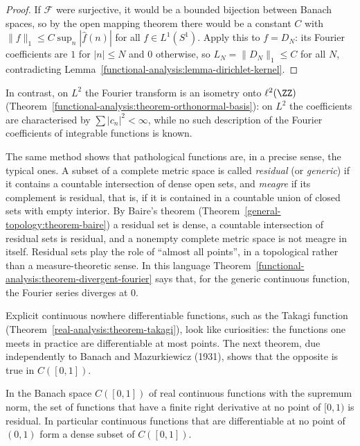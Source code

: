 \begin{proof}
If $\mathcal{F}$ were surjective, it would be a bounded bijection between Banach spaces, so by the open mapping theorem there would be a constant $C$ with $\|f\|_1 \leq C\sup_n|\hat f(n)|$ for all
$f \in L^1(S^1)$. Apply this to $f = D_N$: its Fourier coefficients are $1$ for $|n| \leq N$ and $0$ otherwise, so $L_N = \|D_N\|_1 \leq C$ for all $N$, contradicting
Lemma~\ref{functional-analysis:lemma-dirichlet-kernel}.
\end{proof}

In contrast, on $L^2$ the Fourier transform is an isometry onto $\ell^2(\ZZ)$ (Theorem~\ref{functional-analysis:theorem-orthonormal-basis}): on $L^2$ the coefficients are characterised by
$\sum|c_n|^2 < \infty$, while no such description of the Fourier coefficients of integrable functions is known.

The same method shows that pathological functions are, in a precise sense, the typical ones. A subset of a complete metric space is called \emph{residual} (or \emph{generic}) if it contains a
countable intersection of dense open sets, and \emph{meagre} if its complement is residual, that is, if it is contained in a countable union of closed sets with empty interior. By Baire's theorem
(Theorem~\ref{general-topology:theorem-baire}) a residual set is dense, a countable intersection of residual sets is residual, and a nonempty complete metric space is not meagre in itself. Residual sets
play the role of ``almost all points'', in a topological rather than a measure-theoretic sense. In this language Theorem~\ref{functional-analysis:theorem-divergent-fourier} says that, for the generic
continuous function, the Fourier series diverges at $0$.

Explicit continuous nowhere differentiable functions, such as the Takagi function (Theorem~\ref{real-analysis:theorem-takagi}), look like curiosities: the functions one meets in practice are differentiable at most
points. The next theorem, due independently to Banach and Mazurkiewicz (1931), shows that the opposite is true in $C([0, 1])$.

\begin{theorem}\label{functional-analysis:theorem-nowhere-differentiable}
In the Banach space $C([0, 1])$ of real continuous functions with the supremum norm, the set of functions that have a finite right derivative at no point of $[0, 1)$ is residual. In particular
continuous functions that are differentiable at no point of $(0, 1)$ form a dense subset of $C([0, 1])$.
\end{theorem}

